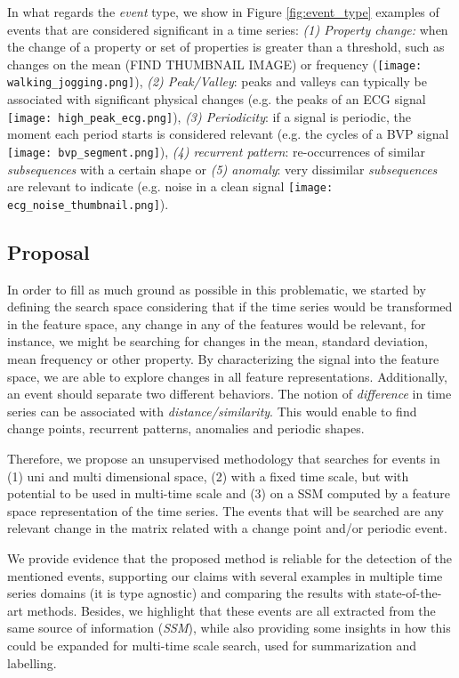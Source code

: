 In what regards the \textit{event} type, we show in Figure \ref{fig:event_type} examples of events that are considered significant in a time series: \textit{(1) Property change:} when the change of a property or set of properties is greater than a threshold, such as changes on the mean (FIND THUMBNAIL IMAGE) or frequency (\texttt{[image: walking\_jogging.png]}), \textit{(2) Peak/Valley}: peaks and valleys can typically be associated with significant physical changes (e.g. the peaks of an ECG signal \texttt{[image: high\_peak\_ecg.png]}), \textit{(3) Periodicity}: if a signal is periodic, the moment each period starts is considered relevant (e.g. the cycles of a BVP signal \texttt{[image: bvp\_segment.png]}), \textit{(4) recurrent pattern}: re-occurrences of similar \textit{subsequences} with a certain shape or \textit{(5) anomaly}: very dissimilar \textit{subsequences} are relevant to indicate (e.g. noise in a clean signal \texttt{[image: ecg\_noise\_thumbnail.png]}).

\subsection{Proposal}

In order to fill as much ground as possible in this problematic, we started by defining the search space considering that if the time series would be transformed in the feature space, any change in any of the features would be relevant, for instance, we might be searching for changes in the mean, standard deviation, mean frequency or other property. By characterizing the signal into the feature space, we are able to explore changes in all feature representations. Additionally, an event should separate two different behaviors. The notion of \textit{difference} in time series can be associated with \textit{distance/similarity}. This would enable to find change points, recurrent patterns, anomalies and periodic shapes. 
\par
Therefore, we propose an unsupervised methodology that searches for events in (1) uni and multi dimensional space, (2) with a fixed time scale, but with potential to be used in multi-time scale and (3) on a \gls{SSM} computed by a feature space representation of the time series. The events that will be searched are any relevant change in the matrix related with a change point and/or periodic event.
\par
We provide evidence that the proposed method is reliable for the detection of the mentioned events, supporting our claims with several examples in multiple time series domains (it is type agnostic) and comparing the results with state-of-the-art methods. Besides, we highlight that these events are all extracted from the same source of information (\textit{SSM}), while also providing some insights in how this could be expanded for multi-time scale search, used for summarization and labelling.
    
